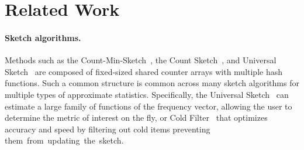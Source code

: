 \section{Related Work}
\label{sec:related}

\paragraph{\textbf{Sketch algorithms.}} Methods such as the Count-Min-Sketch~\cite{CountMinSketch}, the Count Sketch~\cite{CountSketch}, and Universal Sketch~\cite{univmon} are composed of fixed-sized shared counter arrays with multiple hash functions. Such a common structure is common across many sketch algorithms for multiple types of approximate statistics.  Specifically, the Universal Sketch~\cite{univmon,UnivMonTheory}  can estimate a large family of functions of the frequency vector, allowing the user to determine the metric of interest on the fly, or Cold Filter~\cite{ColdFilter} that optimizes accuracy and speed by filtering out cold items preventing \mbox{them from updating the sketch. }

